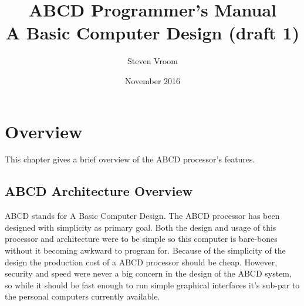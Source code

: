 \documentclass[oneside, a4paper]{memoir}
\begin{document}
\title{ABCD Programmer's Manual \\
\large A Basic Computer Design (draft 1)}
\author{Steven Vroom}
\date{November 2016}
\maketitle
\cleardoublepage

\setlength\arrayrulewidth{1pt}

\frontmatter
\setcounter{tocdepth}{2}
\tableofcontents
\cleardoublepage
\listoffigures
\cleardoublepage
\listoftables
\cleardoublepage


\mainmatter
\chapter{Overview}
This chapter gives a brief overview of the ABCD processor's features. 
\section{ABCD Architecture Overview}
ABCD stands for A Basic Computer Design. The ABCD processor has been designed with simplicity as primary goal. Both the design and usage of this processor and architecture were to be simple so this computer is bare-bones without it becoming awkward to program for. Because of the simplicity of the design the production cost of a ABCD processor should be cheap. However, security and speed were never a big concern in the design of the ABCD system, so while it should be fast enough to run simple graphical interfaces it's sub-par to the personal computers currently available.
\end{document}
